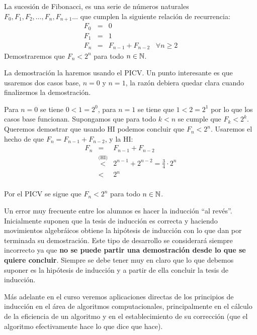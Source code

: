 \begin{ejemplo}
La sucesión de Fibonacci, es una serie de números naturales $F_0,F_1,F_2,\ldots,F_n,F_{n+1}\ldots$ que cumplen la siguiente relación de recurrencia:
\[
\begin{array}{rcl}
F_0 & = & 0 \\
F_1 & = & 1 \\
F_n & = & F_{n-1} + F_{n-2} \;\;\;\forall n\geq 2
\end{array}
\]
Demostraremos que $F_n<2^n$ para todo $n\in\mathbb{N}$.

\begin{demostracion}
La demostración la haremos usando el PICV.
Un punto interesante es que usaremos dos casos base, $n=0$ y $n=1$, la razón debiera quedar clara cuando finalizemos la demostración.
\begin{inducciondemo}
\BI Para $n=0$ se tiene $0<1=2^0$, para $n=1$ se tiene que $1<2=2^1$ por lo que los casos base funcionan.
\HI Supongamos que para todo $k<n$ se cumple que $F_k<2^k$.
\TI Queremos demostrar que usando HI podemos concluir que $F_n<2^n$.
Usaremos el hecho de que $F_n=F_{n-1}+F_{n-2}$, y la HI:
\[
\begin{array}{rcl}
F_n & = & F_{n-1} + F_{n-2} \\
 & \stackrel{\text{(HI)}}{<} & 2^{n-1}+2^{n-2} = \frac{3}{4}\cdot 2^n \\
 & < & 2^n \\
\end{array}
\]
\end{inducciondemo}
Por el PICV se sigue que $F_n<2^n$ para todo $n\in\mathbb{N}$.
\end{demostracion}
\end{ejemplo}

Un error muy frecuente entre los alumnos es hacer la inducción ``al revés''.
Inicialmente suponen que la tesis de inducción es correcta y haciendo movimientos algebráicos obtiene la hipótesis de inducción con lo que dan por terminada su demostración.
Este tipo de desarrollo se considerará siempre incorrecto ya que {\bf no se puede partir una demostración desde lo que se quiere concluir}.
Siempre se debe tener muy en claro que lo que debemos suponer es la hipótesis de inducción y a partir de ella concluir la tesis de inducción.

Más adelante en el curso veremos aplicaciones directas de los principios de inducción en el área de algoritmos computacionales, principalmente en el cálculo de la eficiencia de un algoritmo y en el establecimiento de su corrección (que el algoritmo efectivamente hace lo que dice que hace).

